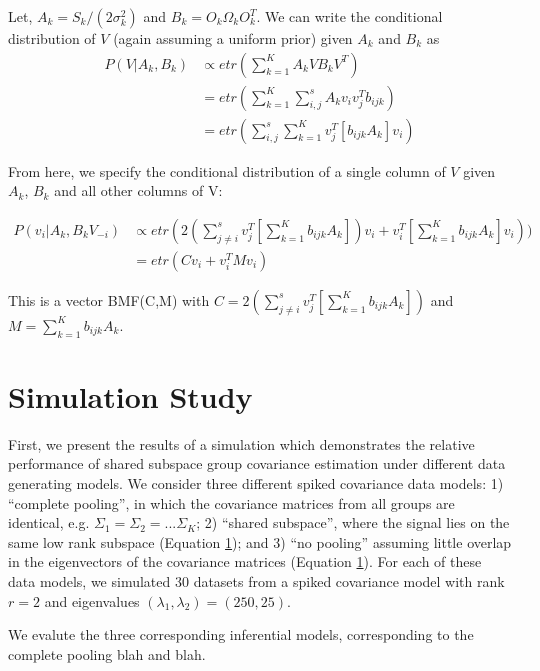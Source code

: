\documentclass{article}
\begin{document}
Let, $A_k = S_k/(2\sigma^2_k)$ and $B_k = O_k\Omega_kO^T_k$.  We can write the conditional distribution of $V$ (again assuming a uniform prior) given $A_k$ and $B_k$ as
\begin{align}
P(V|A_k,B_k) &\propto etr(\sum_{k=1}^KA_kVB_kV^T)\\
&= etr(\sum_{k=1}^K\sum_{i,j}^sA_kv_iv_j^Tb_{ijk})\\
&= etr(\sum_{i,j}^s \sum_{k=1}^K v_j^T[b_{ijk}A_k]v_i)
\end{align}

From here, we specify the conditional distribution of a single column of $V$ given $A_k$, $B_k$ and all other columns of V:

\begin{align}
P(v_i|A_k,B_kV_{-i})  &\propto etr(2(\sum_{j\neq i}^s v_j^T[\sum_{k=1}^K b_{ijk}A_k])v_i+v_i^T[\sum_{k=1}^K b_{ijk}A_k]v_i))\\
&= etr(Cv_i+v_i^TMv_i)
\end{align}

This is a vector BMF(C,M) with $C = 2(\sum_{j\neq i}^s v_j^T[\sum_{k=1}^K b_{ijk}A_k])$ and $M= \sum_{k=1}^K b_{ijk}A_k$.  


\pagebreak

\section{Simulation Study}

First, we present the results of a simulation which demonstrates the
relative performance of shared subspace group covariance estimation
under different data generating models.  We consider three different
spiked covariance data models: 1) ``complete pooling'', in which the
covariance matrices from all groups are identical, e.g.
$\Sigma_1 = \Sigma_2 = ... \Sigma_K$; 2) ``shared subspace'', where
the signal lies on the same low rank subspace (Equation \ref{}); and 3) ``no
pooling'' assuming little overlap in the eigenvectors of the
covariance matrices (Equation \ref{}).  For each of these data models, we
simulated 30 datasets from a spiked covariance model with rank $r=2$
and eigenvalues $(\lambda_1, \lambda_2) = (250, 25)$.  

We evalute the three corresponding inferential models,
corresponding to the complete pooling blah and blah.
\end{document}
